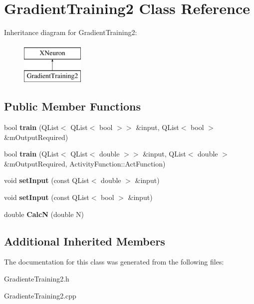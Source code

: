 \hypertarget{class_gradient_training2}{}\section{Gradient\+Training2 Class Reference}
\label{class_gradient_training2}
Inheritance diagram for Gradient\+Training2\+:\begin{figure}[H]
\begin{center}
\leavevmode
\includegraphics[height=2.000000cm]{class_gradient_training2}
\end{center}
\end{figure}
\subsection*{Public Member Functions}
\begin{DoxyCompactItemize}
\item 
\hypertarget{class_gradient_training2_ad038e32c7301f619c678153af1501e2b}{}\label{class_gradient_training2_ad038e32c7301f619c678153af1501e2b} 
bool {\bfseries train} (Q\+List$<$ Q\+List$<$ bool $>$$>$ \&input, Q\+List$<$ bool $>$ \&m\+Output\+Required)
\item 
\hypertarget{class_gradient_training2_a717d68fa1bd96dcb22b7c4595641f82b}{}\label{class_gradient_training2_a717d68fa1bd96dcb22b7c4595641f82b} 
bool {\bfseries train} (Q\+List$<$ Q\+List$<$ double $>$$>$ \&input, Q\+List$<$ double $>$ \&m\+Output\+Required, Activity\+Function\+::\+Act\+Function)
\item 
\hypertarget{class_gradient_training2_a415863710264644934497a55800ca95e}{}\label{class_gradient_training2_a415863710264644934497a55800ca95e} 
void {\bfseries set\+Input} (const Q\+List$<$ double $>$ \&input)
\item 
\hypertarget{class_gradient_training2_a9a6476c0bbd858a4a699994b4791298f}{}\label{class_gradient_training2_a9a6476c0bbd858a4a699994b4791298f} 
void {\bfseries set\+Input} (const Q\+List$<$ bool $>$ \&input)
\item 
\hypertarget{class_gradient_training2_a261483e252104c75c67ab4a5cecbb002}{}\label{class_gradient_training2_a261483e252104c75c67ab4a5cecbb002} 
double {\bfseries CalcN} (double N)
\end{DoxyCompactItemize}
\subsection*{Additional Inherited Members}


The documentation for this class was generated from the following files\+:\begin{DoxyCompactItemize}
\item 
Gradiente\+Training2.\+h\item 
Gradiente\+Training2.\+cpp\end{DoxyCompactItemize}
